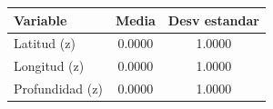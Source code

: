 \begin{tabular}{lcc}
\toprule
Variable & Media & Desv estandar \\
\midrule
Latitud (z) & 0.0000 & 1.0000 \\
Longitud (z) & 0.0000 & 1.0000 \\
Profundidad (z) & 0.0000 & 1.0000 \\
\bottomrule
\end{tabular}